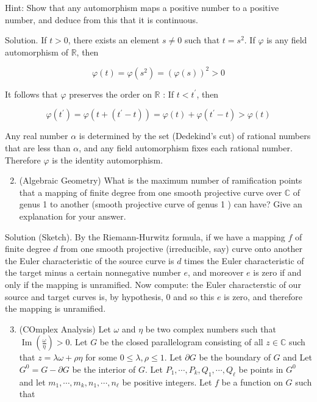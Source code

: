 \documentclass[10pt]{article}
\begin{document}
Hint: Show that any automorphism maps a positive number to a positive number, and deduce from this that it is continuous.

Solution. If $t>0$, there exists an element $s \neq 0$ such that $t=s^{2}$. If $\varphi$ is any field automorphism of $\mathbb{R}$, then

$$
\varphi(t)=\varphi\left(s^{2}\right)=(\varphi(s))^{2}>0
$$

It follows that $\varphi$ preserves the order on $\mathbb{R}$ : If $t<t^{\prime}$, then

$$
\varphi\left(t^{\prime}\right)=\varphi\left(t+\left(t^{\prime}-t\right)\right)=\varphi(t)+\varphi\left(t^{\prime}-t\right)>\varphi(t)
$$

Any real number $\alpha$ is determined by the set (Dedekind's cut) of rational numbers that are less than $\alpha$, and any field automorphism fixes each rational number. Therefore $\varphi$ is the identity automorphism.

\begin{enumerate}
  \setcounter{enumi}{1}
  \item (Algebraic Geometry) What is the maximum number of ramification points that a mapping of finite degree from one smooth projective curve over $\mathbb{C}$ of genus 1 to another (smooth projective curve of genus 1 ) can have? Give an explanation for your answer.
\end{enumerate}

Solution (Sketch). By the Riemann-Hurwitz formula, if we have a mapping $f$ of finite degree $d$ from one smooth projective (irreducible, say) curve onto another the Euler characteristic of the source curve is $d$ times the Euler characteristic of the target minus a certain nonnegative number $e$, and moreover $e$ is zero if and only if the mapping is unramified. Now compute: the Euler characterstic of our source and target curves is, by hypothesis, 0 and so this $e$ is zero, and therefore the mapping is unramified.

\begin{enumerate}
  \setcounter{enumi}{2}
  \item (COmplex Analysis) Let $\omega$ and $\eta$ be two complex numbers such that $\operatorname{Im}\left(\frac{\omega}{\eta}\right)>0$. Let $G$ be the closed parallelogram consisting of all $z \in \mathbb{C}$ such that $z=\lambda \omega+\rho \eta$ for some $0 \leq \lambda, \rho \leq 1$. Let $\partial G$ be the boundary of $G$ and Let $G^{0}=G-\partial G$ be the interior of $G$. Let $P_{1}, \cdots, P_{k}, Q_{1}, \cdots, Q_{\ell}$ be points in $G^{0}$ and let $m_{1}, \cdots, m_{k}, n_{1}, \cdots, n_{\ell}$ be positive integers. Let $f$ be a function on $G$ such that
\end{enumerate}
\end{document}
